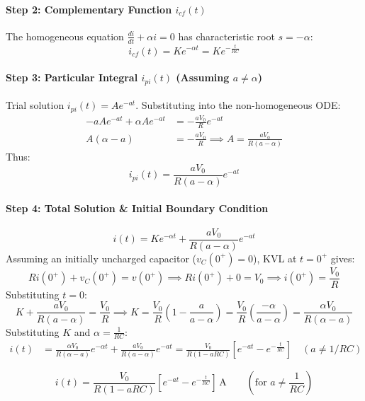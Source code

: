 \documentclass[11pt,a4paper,oneside]{article}
\begin{document}
\paragraph{Step 2: Complementary Function $i_{cf}(t)$}
The homogeneous equation $\frac{di}{dt} + \alpha i = 0$ has characteristic root $s = -\alpha$:
\begin{equation}
  i_{cf}(t) = K e^{-\alpha t} = K e^{-\frac{t}{RC}}
\end{equation}

\paragraph{Step 3: Particular Integral $i_{pi}(t)$ (Assuming $a \ne \alpha$)}
Trial solution $i_{pi}(t) = A e^{-at}$. Substituting into the non-homogeneous ODE:
\begin{align*}
  -a A e^{-at} + \alpha A e^{-at} &= -\frac{a V_0}{R} e^{-at} \\
  A(\alpha - a) &= -\frac{a V_0}{R} \implies A = \frac{a V_0}{R(a - \alpha)}
\end{align*}
Thus:
\begin{equation}
  i_{pi}(t) = \frac{a V_0}{R(a - \alpha)} e^{-at}
\end{equation}

\paragraph{Step 4: Total Solution \& Initial Boundary Condition}
\begin{equation}
  i(t) = K e^{-\alpha t} + \frac{a V_0}{R(a - \alpha)} e^{-at}
\end{equation}
Assuming an initially uncharged capacitor ($v_C(0^+) = 0$), KVL at $t=0^+$ gives:
\[
R i(0^+) + v_C(0^+) = v(0^+) \implies R i(0^+) + 0 = V_0 \implies i(0^+) = \frac{V_0}{R}
\]
Substituting $t=0$:
\[
K + \frac{a V_0}{R(a - \alpha)} = \frac{V_0}{R} \implies K = \frac{V_0}{R} \left(1 - \frac{a}{a - \alpha}\right) = \frac{V_0}{R} \left(\frac{-\alpha}{a - \alpha}\right) = \frac{\alpha V_0}{R(\alpha - a)}
\]
Substituting $K$ and $\alpha = \frac{1}{RC}$:
\begin{align}
  i(t) &= \frac{\alpha V_0}{R(\alpha - a)} e^{-\alpha t} + \frac{a V_0}{R(a - \alpha)} e^{-at} = \frac{V_0}{R(1 - aRC)} \left[e^{-at} - e^{-\frac{t}{RC}}\right] \quad (a \ne 1/RC)
\end{align}

\begin{answerbox}
\[
i(t) = \frac{V_0}{R(1 - aRC)} \left[e^{-at} - e^{-\frac{t}{RC}}\right]\,\mathrm{A} \qquad \left(\text{for } a \ne \frac{1}{RC}\right)
\]
\end{answerbox}
\end{document}
